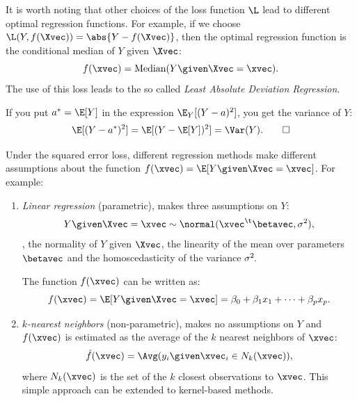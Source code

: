 It is worth noting that other choices of the loss function $\L$ lead to different optimal regression functions. For example, if we choose $\L(Y\negthinspace, f(\Xvec)) = \abs{Y - f(\Xvec)}$, then the optimal regression function is the conditional median of $Y$ given $\Xvec$:
\begin{equation}
    f(\xvec) = \text{Median}(Y \given \Xvec = \xvec).
\end{equation}
The use of this loss leads to the so called \emph{Least Absolute Deviation Regression}.

\begin{observation}
    If you put $a^* = \E[Y]$ in the expression $\E_Y[(Y - a)^2]$, you get the variance of $Y$:
    \begin{equation}
        \E[(Y - a^*)^2] = \E[(Y - \E[Y])^2] = \Var(Y).\qedhere
    \end{equation}
\end{observation}

Under the squared error loss, different regression methods make different assumptions about the function ${f(\xvec) = \E[Y \given \Xvec = \xvec]}$. For example:
\begin{enumerate}
    \item \emph{Linear regression} (parametric), makes three assumptions on $Y$:
          \begin{equation}
              Y \given \Xvec = \xvec \sim \normal(\xvec^\t\betavec, \sigma^2),
          \end{equation}
          \ie, the normality of $Y$ given $\Xvec$, the linearity of the mean over parameters $\betavec$ and the homoscedasticity of the variance $\sigma^2\negthinspace$.

          The function $f(\xvec)$ can be written as:
          \begin{equation}
              f(\xvec) = \E[Y \given \Xvec = \xvec] = \beta_0 + \beta_1 x_1 + \cdots + \beta_p x_p.
          \end{equation}
    \item \emph{$k$-nearest neighbors} (non-parametric), makes no assumptions on $Y$ and $f(\xvec)$ is estimated as the average of the $k$ nearest neighbors of $\xvec$:
          \begin{equation}
              \hat{f}(\xvec) = \Avg(y_i \given \xvec_i \in N_k(\xvec)),
          \end{equation}
          where $N_k(\xvec)$ is the set of the $k$ closest observations to $\xvec$. This simple approach can be extended to kernel-based methods.
\end{enumerate}

